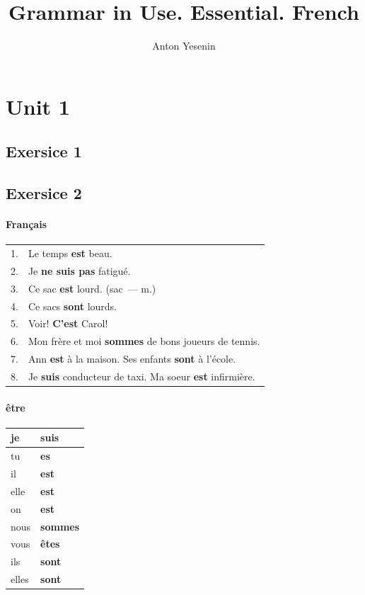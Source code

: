 \documentclass[9pt, oneside]{article}
\title{Grammar in Use. Essential. French}
\author{Anton Yesenin}
\date{}
\begin{document}
\maketitle
\pagebreak

\section{Unit 1}
\subsection{Exersice 1}

\subsection{Exersice 2}
\paragraph{Français}
\begin{tabular}{l l}
1. & Le temps {\bfseries est} beau.\\
2. & Je {\bfseries ne suis pas} fatigué.\\
3. & Ce sac {\bfseries est} lourd. {\fontsize{8}{12.2}\selectfont (sac~--- m.)}\\
4. & Ce sacs {\bfseries sont} lourds.\\
5. & Voir! {\bfseries C'est} Carol! \\
6. & Mon frère et moi {\bfseries sommes} de bons joueurs de tennis.\\
7. & Ann {\bfseries est} à la maison. Ses enfants {\bfseries sont} à l'école.\\
8. & Je {\bfseries suis} conducteur de taxi. Ma soeur {\bfseries est} infirmière.\\
\end{tabular}

\paragraph*{être}
\begin{tabular}{l|l}
	je & {\bfseries suis}\\
	\hline
	tu & {\bfseries es}\\
	\hline
	il & {\bfseries est}\\
	\hline
	elle & {\bfseries est}\\
	\hline
	on & {\bfseries est}\\
	\hline
	nous & {\bfseries sommes}\\
	\hline
	vous & {\bfseries êtes}\\
	\hline
	ils & {\bfseries sont}\\
	\hline
	elles & {\bfseries sont}\\
\end{tabular}
\end{document}
